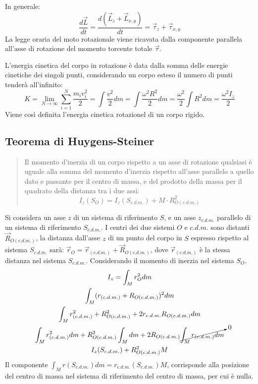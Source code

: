 \documentclass{article}
\numberwithin{equation}{subsection}
\begin{document}
In generale: 
\begin{equation*}
    \displaystyle\frac{d\vec{L}}{dt}=\frac{d(\vec{L}_z+\vec{L}_{x,y})}{dt}=\vec{\tau}_z+\vec{\tau}_{x,y}
\end{equation*}
La legge oraria del moto rotazionale viene ricavata dalla componente parallela all'asse di rotazione del momento torcente totale $\vec{\tau}$. 


L'energia cinetica del corpo in rotazione è data dalla somma delle energie 
cinetiche dei singoli punti, considerando un corpo esteso il 
numero di punti tenderà all'infinito:
\begin{equation}
    K=\displaystyle\lim_{N\to\infty}\sum_{i=1}^{N}\frac{m_iv_i^2}{2}=\int\frac{v^2}{2}dm=\int\frac{\omega^2R^2}{2}dm=\frac{\omega^2}{2}\int R^2dm=\frac{\omega^2I_z}{2}
\end{equation}
Viene così definita l'energia cinetica rotazionel di un corpo rigido. 

\subsection{Teorema di Huygens-Steiner}
\begin{quotation}
    Il momento d'inerzia di un corpo rispetto a un asse di 
    rotazione qualsiasi è uguale alla somma del momento d'inerzia rispetto all'asse parallelo a quello dato e 
    passante per il centro di massa, e del prodotto della massa 
    per il quadrato della distanza tra i due assi:
    \begin{equation}
        I_z(S_O)=I_z(S_{c.d.m.})+M\cdot R^2_{O(c.d.m.)}
    \end{equation}
\end{quotation}
Si considera un asse $z$ di un sistema di riferimento $S$, e 
un asse $z_{c.d.m.}$ parallelo di un sistema di riferimento $S_{c.d.m.}$. 
I centri dei due sistemi $O$ e $c.d.m.$ sono distanti $\vec{R}_{O(c.d.m.)}$, 
la distanza dall'asse $z$ di un punto del corpo in $S$ espresso rispetto al 
sistema $S_{c.d.m.}$ sarà: $\vec{r}_O=\vec{r}_{(c.d.m.)}+\vec{R}_{O(c.d.m.)}$,  
dove $\vec{r}_{(c.d.m.)}$ è la stessa distanza nel sistema $S_{c.d.m.}$. 
Considerando il momento di inerzia nel sistema $S_O$. 
\begin{gather*}
    I_z=\displaystyle\int_M {r}_O^2dm\\
    \int_M({r}_{(c.d.m.)}+{R}_{O(c.d.m.)})^2dm\\
    \int_M r_{(c.d.m.)}^2+R_{O(c.d.m.)}^2+2r_{c.d.m.}R_{O(c.d.m.)}dm\\
    \int_M r_{(c.d.m.)}^2dm+R_{O(c.d.m.)}^2\int_M dm+2R_{O(c.d.m.)}\cancelto{0}{\int_Mr_{(c.d.m.)}dm}\\
    I_z(S_{c.d.m.})+R_{O(c.d.m.)}^2M
\end{gather*}
Il componente $\displaystyle\int_M r(S_{c.d.m.})dm=r_{c.d.m.}(S_{c.d.m.})M$, corrisponde alla posizione del centro di massa nel sistema di riferimento del centro di massa, per cui è nulla. 
\end{document}
